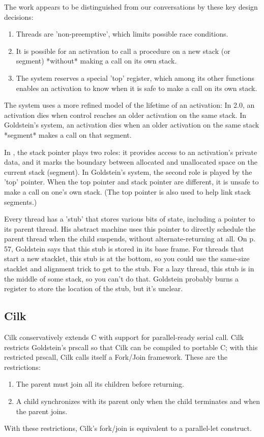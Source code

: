 \documentclass[twoside,12pt]{article}
\begin{document}
The work appears to be distinguished from our {\PAL} conversations by
these key design decisions:
\begin{enumerate}
\item Threads are 'non-preemptive', which limits possible race conditions.
\item  It is possible for an activation to call a procedure on a new
    stack (or segment) *without* making a call on its own stack.
\item The system reserves a special 'top' register, which among its
    other functions enables an activation to know when it is safe to
    make a call on its own stack.
\end{enumerate}
The system uses a more refined model of the lifetime of an activation:
In {\PAL} 2.0, an activation dies when control reaches an older
activation on the same stack.  In Goldstein's system, an activation
dies when an older activation on the same stack *segment* makes a call
on that segment.

In {\PAL}, the stack pointer plays two roles: it provides access to an
activation's private data, and it marks the boundary between allocated
and unallocated space on the current stack (segment).  In Goldstein's
system, the second role is played by the 'top' pointer.  When the top
pointer and stack pointer are different, it is unsafe to make a call
on one's own stack.  (The top pointer is also used to help link stack
segments.)

Every thread has a 'stub' that stores various bits of state, including
a pointer to its parent thread.  His abstract machine uses this
pointer to directly schedule the parent thread when the child
suspends, without alternate-returning at all.  On p. 57, Goldstein
says that this stub is stored in its base frame.  For threads that
start a new stacklet, this stub is at the bottom, so you could use the
same-size stacklet and alignment trick to get to the stub.  For a lazy
thread, this stub is in the middle of some stack, so you can't do
that.  Goldstein probably burns a register to store the location of the stub,
but it's unclear.

\subsection{Cilk}

Cilk conservatively extends C with support for parallel-ready serial call.  Cilk restricts Goldstein's prscall so that Cilk can be compiled to portable C; with this restricted prscall, Cilk calls itself a Fork/Join framework.  These are the restrictions:
\begin{enumerate}
\item The parent must join all its children before returning.
\item A child synchronizes with its parent only when the child terminates and when the parent joins.
\end{enumerate}
With these restrictions, Cilk's fork/join is equivalent to a parallel-let construct.
\end{document}
